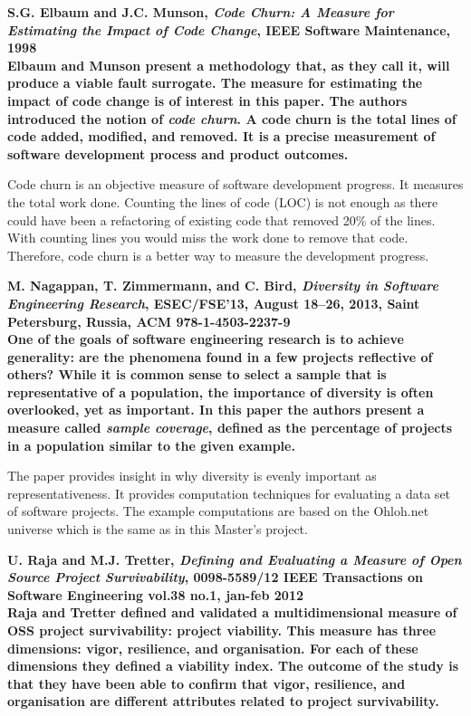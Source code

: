 \begin{thebibliography}{99}
	 \bfseries{S.G. Elbaum and J.C. Munson, \emph{Code Churn: A
		Measure for Estimating the Impact of Code Change}, IEEE Software Maintenance,
		1998}\rm
		\\

		Elbaum and Munson present a methodology that, as they call it, will produce a
		viable fault surrogate. The measure for estimating the impact of code change
		is of interest in this paper. The authors introduced the notion of \emph{code
		churn}. A code churn is the total lines of code added, modified, and removed.
		It is a precise measurement of software development process and product
		outcomes.

		Code churn is an objective measure of software development progress. It
		measures the total work done. Counting the lines of code (LOC) is not enough
		as there could have been a refactoring of existing code that removed 20\% of
		the lines. With counting lines you would miss the work done to remove that
		code. Therefore, code churn is a better way to measure the development
		progress.

	 \bfseries{M. Nagappan, T. Zimmermann, and C. Bird,
		\emph{Diversity in Software Engineering Research}, ESEC/FSE'13, August 18–26,
		2013, Saint Petersburg, Russia, ACM 978-1-4503-2237-9}\rm
		\\

		One of the goals of software engineering research is to achieve generality:
		are the phenomena found in a few projects reflective of others? While it is
		common sense to select a sample that is representative of a population, the
		importance of diversity is often overlooked, yet as important. In this paper
		the authors present a measure called \emph{sample coverage}, defined as the
		percentage of projects in a population similar to the given example.
		
		The paper provides insight in why diversity is evenly important as
		representativeness. It provides computation techniques for evaluating a data
		set of software projects. The example computations are based on the Ohloh.net
		universe which is the same as in this Master's project.

	 \bfseries{U. Raja and M.J. Tretter, \emph{Defining and
		Evaluating a Measure of Open Source Project Survivability}, 0098-5589/12 IEEE
		Transactions on Software Engineering vol.38 no.1, jan-feb 2012}\rm
		\\

		Raja and Tretter defined and validated a multidimensional measure of OSS
		project survivability: project viability. This measure has three dimensions:
		vigor, resilience, and organisation. For each of these dimensions they defined
		a viability index. The outcome of the study is that they have been able to
		confirm that vigor, resilience, and organisation are different attributes
		related to project survivability.


\end{thebibliography}
